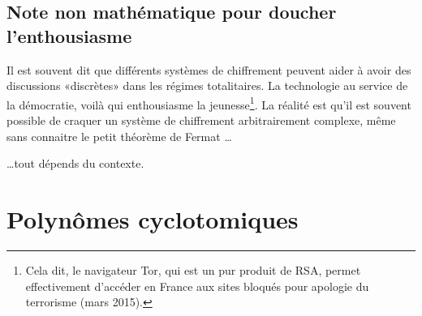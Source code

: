 \subsection{Note non mathématique pour doucher l'enthousiasme}

Il est souvent dit\cite{ooTODUooAhFHQk} que différents systèmes de chiffrement peuvent aider à avoir des discussions «discrètes» dans les régimes totalitaires. La technologie au service de la démocratie, voilà qui enthousiasme la jeunesse\footnote{Cela dit, le navigateur Tor\cite{ooHBLCooYtBBfx}, qui est un pur produit de RSA, permet effectivement d'accéder en France aux sites bloqués pour apologie du terrorisme (mars 2015).}. La réalité est qu'il est souvent possible de craquer un système de chiffrement arbitrairement complexe, même sans connaitre le petit théorème de Fermat \ldots


\noindent \ldots tout dépends du contexte.

\section{Polynômes cyclotomiques}

